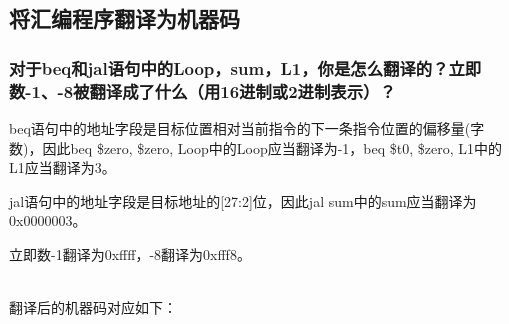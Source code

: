 \documentclass{article}
\begin{document}
        \subsection{将汇编程序翻译为机器码}
            \subsubsection*{对于beq和jal语句中的Loop，sum，L1，你是怎么翻译的？立即数-1、-8被翻译成了什么（用16进制或2进制表示）？}
            beq语句中的地址字段是目标位置相对当前指令的下一条指令位置的偏移量(字数)，因此beq \$zero, \$zero, Loop中的Loop应当翻译为-1，beq \$t0, \$zero, L1中的L1应当翻译为3。

            jal语句中的地址字段是目标地址的[27:2]位，因此jal sum中的sum应当翻译为0x0000003。

            立即数-1翻译为0xffff，-8翻译为0xfff8。

            ~\\

            翻译后的机器码对应如下：
\end{document}
